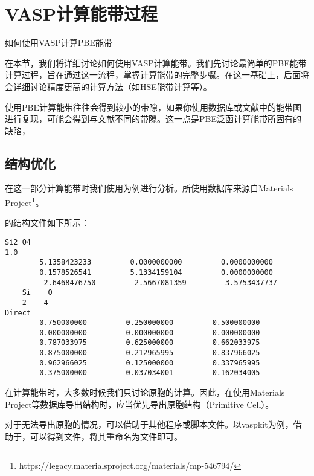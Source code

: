 \section{VASP计算能带过程}\label{sec:VASP计算能带过程}

\begin{Abstract}
    \item 如何使用VASP计算PBE能带
\end{Abstract}

在本节，我们将详细讨论如何使用VASP计算能带。我们先讨论最简单的PBE能带计算过程，旨在通过这一流程，掌握计算能带的完整步骤。在这一基础上，后面将会详细讨论精度更高的计算方法（如HSE能带计算等）。

\begin{attention}
    使用PBE计算能带往往会得到较小的带隙，如果你使用数据库或文献中的能带图进行复现，可能会得到与文献不同的带隙。这一点是PBE泛函计算能带所固有的缺陷，
\end{attention}

\subsection{结构优化}\label{subsec:VASP计算能带过程-结构优化}

在这一部分计算能带时我们使用为例进行分析。所使用数据库来源自Materials Project\footnote{https://legacy.materialsproject.org/materials/mp-546794/}。

的结构文件如下所示：

\begin{lstlisting}[caption=POSCAR]
Si2 O4
1.0
        5.1358423233         0.0000000000         0.0000000000
        0.1578526541         5.1334159104         0.0000000000
        -2.6468476750        -2.5667081359         3.5753437737
    Si    O
    2    4
Direct
        0.750000000         0.250000000         0.500000000
        0.000000000         0.000000000         0.000000000
        0.787033975         0.625000000         0.662033975
        0.875000000         0.212965995         0.837966025
        0.962966025         0.125000000         0.337965995
        0.375000000         0.037034001         0.162034005
\end{lstlisting}

\begin{attention}
    在计算能带时，大多数时候我们只讨论原胞的计算。因此，在使用Materials Project等数据库导出结构时，应当优先导出原胞结构（Primitive Cell）。

    对于无法导出原胞的情况，可以借助于其他程序或脚本文件。以vaspkit为例，借助于，可以得到文件，将其重命名为文件即可。
\end{attention}

